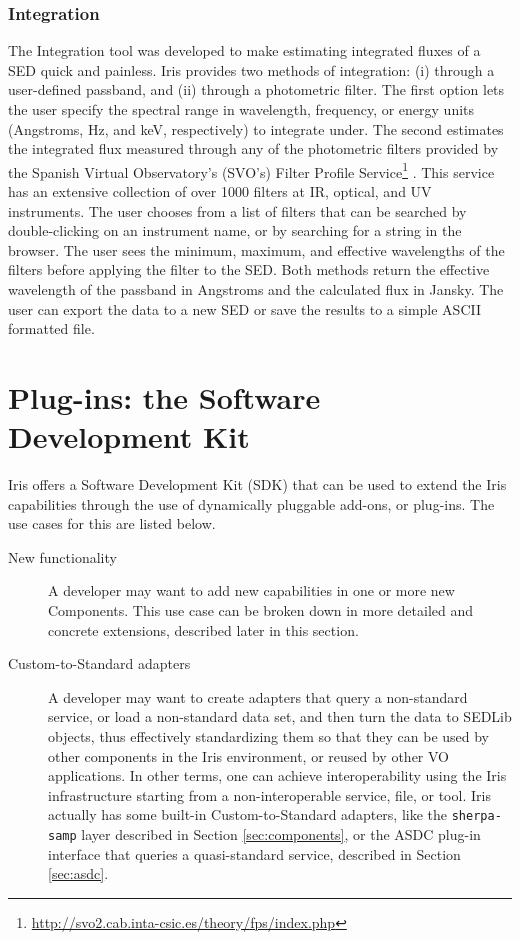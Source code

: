 \documentclass[final,5p,authoryear]{elsarticle}
\begin{document}
\subsubsection{Integration} The Integration tool was developed to make
estimating integrated fluxes of a SED quick and painless. Iris provides two
methods of integration: (i) through a user-defined passband, and (ii) through a
photometric filter. The first option lets the user specify the spectral range in
wavelength, frequency, or energy units (Angstroms, Hz, and keV, respectively) to
integrate under. The second estimates the integrated flux measured through any
of the photometric filters provided by the Spanish Virtual Observatory's (SVO's)
Filter Profile
Service\footnote{\url{http://svo2.cab.inta-csic.es/theory/fps/index.php}}
\citep{2013arXiv1312.3249S}. This service has an extensive collection
of over 1000 filters at IR, optical, and UV
instruments. The user chooses from a list of filters
that can be searched by double-clicking on an instrument name, or by searching
for a string in the browser. The user sees the minimum, maximum, and effective
wavelengths of the filters before applying the filter to the SED.
Both methods return the effective wavelength of the passband in Angstroms and
the calculated flux in Jansky. The user can export the data to a new SED or
save the results to a simple ASCII formatted file.

\section{Plug-ins: the Software Development Kit} \label{sec:plugins}

Iris offers a Software Development Kit (SDK) that can be used to extend the Iris
capabilities through the use of dynamically pluggable add-ons, or plug-ins.  The
use cases for this are listed below.
\begin{description} \item[New
functionality] A developer may want to add new capabilities in one or
more new Components. This use case can be broken down in more detailed and
concrete extensions, described later in this section.  \item[Custom-to-Standard
adapters] A developer may want to create adapters that query a non-standard
service, or load a non-standard data set, and then turn the data to SEDLib
objects, thus effectively standardizing them so that they can be used by other
components in the Iris environment, or reused by other VO applications. In other
terms, one can achieve interoperability using the Iris infrastructure starting
from a non-interoperable service, file, or tool. Iris actually has some built-in
Custom-to-Standard adapters, like the \verb|sherpa-samp| layer described in Section
\ref{sec:components}, or the ASDC plug-in interface that queries a
quasi-standard service, described in Section \ref{sec:asdc}.  \end{description}
\end{document}
